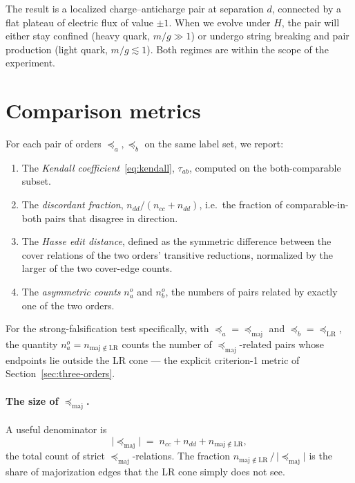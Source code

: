 \documentclass[11pt,a4paper]{article}
\theoremstyle{definition}
\theoremstyle{plain}
\theoremstyle{remark}
\newcommand{\abs}[1]{\lvert #1 \rvert}
\newcommand{\maj}{\mathrm{maj}}
\newcommand{\LR}{\mathrm{LR}}
\begin{document}
The result is a localized charge--anticharge pair at separation $d$,
connected by a flat plateau of electric flux of value $\pm 1$.  When
we evolve under $H$, the pair will either stay confined (heavy quark,
$m/g \gg 1$) or undergo string breaking and pair production (light
quark, $m/g \lesssim 1$).  Both regimes are within the scope of the
experiment.

\section{Comparison metrics}\label{sec:metrics}

For each pair of orders $\preceq_a, \preceq_b$ on the same label set,
we report:

\begin{enumerate}[label=(\alph*),leftmargin=*]
\item The \emph{Kendall coefficient}~\eqref{eq:kendall}, $\tau_{ab}$,
      computed on the both-comparable subset.
\item The \emph{discordant fraction}, $n_{dd} / (n_{cc} + n_{dd})$,
      i.e.\ the fraction of comparable-in-both pairs that disagree
      in direction.
\item The \emph{Hasse edit distance}, defined as the symmetric
      difference between the cover relations of the two orders'
      transitive reductions, normalized by the larger of the two
      cover-edge counts.
\item The \emph{asymmetric counts} $n_a^o$ and $n_b^o$, the numbers
      of pairs related by exactly one of the two orders.
\end{enumerate}

For the strong-falsification test specifically, with $\preceq_a =
\preceq_{\maj}$ and $\preceq_b = \preceq_{\LR}$, the quantity
$n_a^o = n_{\maj \notin \LR}$ counts the number of
$\preceq_{\maj}$-related pairs whose endpoints lie outside the LR
cone --- the explicit criterion-1 metric of
Section~\ref{sec:three-orders}.

\paragraph{The size of $\preceq_{\maj}$.} A useful denominator is
\begin{equation}\label{eq:majsize}
  \abs{\preceq_{\maj}}
  \;=\;
  n_{cc} + n_{dd} + n_{\maj \notin \LR},
\end{equation}
the total count of strict $\preceq_{\maj}$-relations.  The fraction
$n_{\maj \notin \LR}\, /\, \abs{\preceq_{\maj}}$ is the share of
majorization edges that the LR cone simply does not see.
\end{document}
